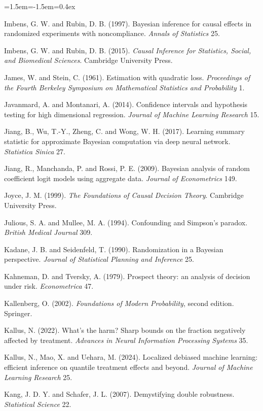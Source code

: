 \begin{list}{}{\leftmargin=1.5em\itemindent=-1.5em\itemsep=0.4ex}
\item Imbens, G. W. and Rubin, D. B. (1997). Bayesian inference for causal effects in randomized experiments with noncompliance. \emph{Annals of Statistics} 25.
\item Imbens, G. W. and Rubin, D. B. (2015). \emph{Causal Inference for Statistics, Social, and Biomedical Sciences}. Cambridge University Press.
\item James, W. and Stein, C. (1961). Estimation with quadratic loss. \emph{Proceedings of the Fourth Berkeley Symposium on Mathematical Statistics and Probability} 1.
\item Javanmard, A. and Montanari, A. (2014). Confidence intervals and hypothesis testing for high dimensional regression. \emph{Journal of Machine Learning Research} 15.
\item Jiang, B., Wu, T.-Y., Zheng, C. and Wong, W. H. (2017). Learning summary statistic for approximate Bayesian computation via deep neural network. \emph{Statistica Sinica} 27.
\item Jiang, R., Manchanda, P. and Rossi, P. E. (2009). Bayesian analysis of random coefficient logit models using aggregate data. \emph{Journal of Econometrics} 149.
\item Joyce, J. M. (1999). \emph{The Foundations of Causal Decision Theory}. Cambridge University Press.
\item Julious, S. A. and Mullee, M. A. (1994). Confounding and Simpson's paradox. \emph{British Medical Journal} 309.
\item Kadane, J. B. and Seidenfeld, T. (1990). Randomization in a Bayesian perspective. \emph{Journal of Statistical Planning and Inference} 25.
\item Kahneman, D. and Tversky, A. (1979). Prospect theory: an analysis of decision under risk. \emph{Econometrica} 47.
\item Kallenberg, O. (2002). \emph{Foundations of Modern Probability}, second edition. Springer.
\item Kallus, N. (2022). What's the harm? Sharp bounds on the fraction negatively affected by treatment. \emph{Advances in Neural Information Processing Systems} 35.
\item Kallus, N., Mao, X. and Uehara, M. (2024). Localized debiased machine learning: efficient inference on quantile treatment effects and beyond. \emph{Journal of Machine Learning Research} 25.
\item Kang, J. D. Y. and Schafer, J. L. (2007). Demystifying double robustness. \emph{Statistical Science} 22.

\end{list}

